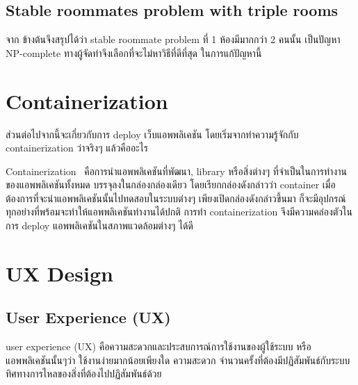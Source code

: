 \subsection{Stable roommates problem with triple rooms}
\cite{iwama2007stable}
จาก ข้างต้นจึงสรุปได้ว่า stable roommate problem ที่ 1 ห้องมีมากกว่า 2 คนนั้น
เป็นปัญหา NP-complete ทางผู้จัดทำจึงเลือกที่จะไม่หาวิธีที่ดีที่สุด ในการแก้ปัญหานี้

\section{Containerization}
ส่วนต่อไปจากนี้จะเกี่ยวกับการ deploy เว็บแอพพลิเคชัน โดยเริ่มจากทำความรู้จักกับ 
containerization ว่าจริงๆ แล้วคืออะไร

Containerization~\cite{ctnrh} คือการนำแอพพลิเคชันที่พัฒนา, library หรือสิ่งต่างๆ ที่จำเป็นในการทำงานของแอพพลิเคชันทั้งหมด บรรจุลงในกล่องกล่องเดียว โดยเรียกกล่องดังกล่าวว่า container 
เมื่อต้องการที่จะนำแอพพลิเคชันนั้นไปทดสอบในระบบต่างๆ เพียงเปิดกล่องดังกล่าวขึ้นมา
ก็จะมีอุปกรณ์ทุกอย่างที่พร้อมจะทำให้แอพพลิเคชันทำงานได้ปกติ การทำ containerization 
จึงมีความคล่องตัวในการ deploy แอพพลิเคชันในสภาพแวดล้อมต่างๆ ได้ดี 

\section{UX Design}
\subsection{User Experience (UX)}
user experience (UX) คือความสะดวกและประสบการณ์การใช้งานของผู้ใช้ระบบ 
หรือแอพพลิเคชันนั้นๆว่า ใช้งานง่ายมากน้อยเพียงใด ความสะดวก จำนวนครั้งที่ต้องมีปฏิสัมพันธ์กับระบบ
ทิศทางการไหลของสิ่งที่ต้องไปปฏิสัมพันธ์ด้วย

